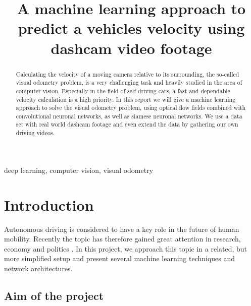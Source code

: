\documentclass[conference]{IEEEtran}
\begin{document}
\title{A machine learning approach to predict a vehicles velocity using dashcam video footage}

\author{
\and
{}
}

\maketitle

\begin{abstract}
Calculating the velocity of a moving camera relative to its surrounding, the so-called visual odometry 
problem, is a very challenging task and heavily studied in the area of computer vision. Especially
in the field of self-driving cars, a fast and dependable velocity calculation is a high priority.
In this report we will give a machine learning approach to solve the visual odometry problem, using 
optical flow fields combined with convolutional neuronal networks, as well as siamese neuronal networks.
We use a data set with real world dashcam footage and even extend the data by gathering our own
driving videos.
\end{abstract}

\begin{IEEEkeywords}
deep learning, computer vision, visual odometry
\end{IEEEkeywords}

\section{Introduction}

Autonomous driving is considered to have a key role in the future of human mobility. Recently the topic has therefore gained great attention in research, economy and politics \cite{Maurer2016}. In this project, we approach this topic in a related, but more simplified setup and present several machine learning techniques and network architectures.

\subsection{Aim of the project}
\label{subsec:AimAndMeasure}
\end{document}
